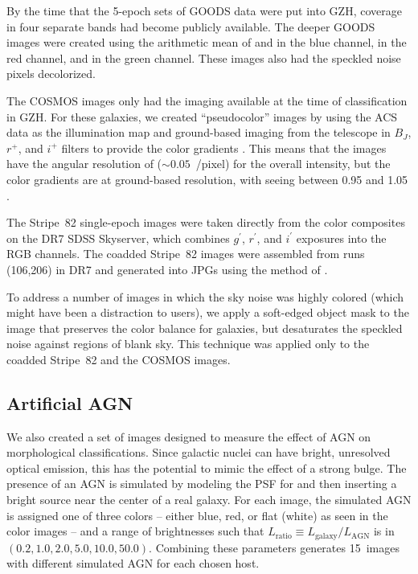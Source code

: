 \documentclass[usenatbib]{mn2e}
\begin{document}
By the time that the 5-epoch sets of GOODS data were put into GZH, coverage in four separate \hst{} bands had become publicly available. The deeper GOODS images were created using the arithmetic mean of \Bband{} and \Vband in the blue channel, \Iband{} in the red channel, and \zband in the green channel. These images also had the speckled noise pixels decolorized. 

The COSMOS images only had the \Iband{} imaging available at the time of classification in GZH. For these galaxies, we created ``pseudocolor'' images by using the ACS \Iband{} data as the illumination map and ground-based imaging from the \subaru{} telescope in $B_J$, $r^+$, and $i^+$ filters to provide the color gradients \citep[see][for further details]{gri12}. This means that the images have the angular resolution of \hst{} ($\sim0.05$~\arcsec/pixel) for the overall intensity, but the color gradients are at ground-based resolution, with seeing between 0\arcsec.95 and 1\arcsec.05 \citep{tan07}.

The Stripe~82 single-epoch images were taken directly from the color composites on the DR7 SDSS Skyserver, which combines $g^{\prime}$, $r^{\prime}$, and $i^{\prime}$ exposures into the RGB channels. The coadded Stripe~82 images were assembled from runs (106,206) in DR7 and generated into JPGs using the method of \citet{lup04}.

To address a number of images in which the sky noise was highly colored (which might have been a distraction to users), we apply a soft-edged object mask to the image that preserves the color balance for galaxies, but desaturates the speckled noise against regions of blank sky. This technique was applied only to the coadded Stripe~82 and the COSMOS images.

\subsection{Artificial AGN}

We also created a set of images designed to measure the effect of AGN on morphological classifications. Since galactic nuclei can have bright, unresolved optical emission, this has the potential to mimic the effect of a strong bulge. The presence of an AGN is simulated by modeling the PSF for \hst{} and then inserting a bright source near the center of a real galaxy. For each image, the simulated AGN is assigned one of three colors -- either blue, red, or flat (white) as seen in the color images -- and a range of brightnesses such that $L_\mathrm{ratio} \equiv L_\mathrm{galaxy}/L_\mathrm{AGN}$ is in $(0.2,1.0,2.0,5.0,10.0,50.0)$. Combining these parameters generates 15~images with different simulated AGN for each chosen host. 
\end{document}
